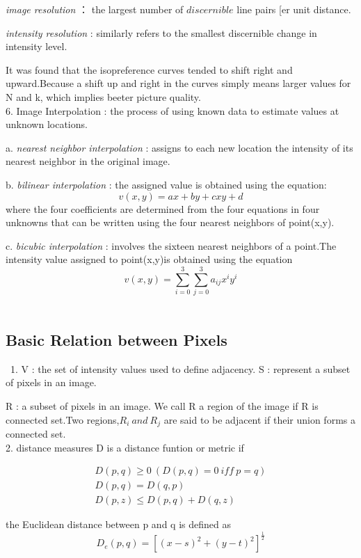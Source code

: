 \documentclass[12pt]{article}
\begin{document}
\quad \textsl{image resolution} ： the largest number of \begin{math}discernible\end{math} line pairs [er unit distance.

\quad \textsl{intensity resolution} : similarly refers to the smallest discernible change in intensity level.

It was found that the isopreference curves tended to shift right and upward.Because a shift up and right in the curves simply means larger values for N and k, which implies beeter picture quality.
\\
6. Image Interpolation : the process of using known data to estimate values at unknown locations.

a. \textsl{nearest neighbor interpolation} : assigns to each new location the intensity of its nearest neighbor in the original image.

b. \textsl{bilinear interpolation} : the assigned value is obtained using the equation:
\[
v(x,y)=ax+by+cxy+d
\]
where the four coefficients are determined from the four equations in four unknowns that can be written using the four nearest neighbors of point(x,y).

c. \textsl{bicubic interpolation} : involves the sixteen nearest neighbors of a point.The intensity value assigned to point(x,y)is obtained using the equation
\[ 
v(x,y)=\sum_{i=0}^3\sum_{j=0}^3a_{ij}x^iy^i
\]
\\
\subsection{Basic Relation between Pixels}\
1. V : the set of intensity values used to define adjacency.
\quad S : represent a subset of pixels in an image.

\quad R : a subset of pixels in an image. We call R a region of the image if R is connected set.Two regions,$R_i\ and\ R_j$ are said to be adjacent if their union forms a connected set.
\\
2. distance measures
  D is a distance funtion or metric if

\begin{eqnarray*}
D(p,q)\ge0\ (D(p,q)=0\ iff\ p=q)\\
D(p,q)=D(q,p)\ \ \ \ \ \ \ \ \ \ \ \\
D(p,z)\leq D(p,q)+D(q,z)\ \ \ \ 
\end{eqnarray*}

the Euclidean distance between p and q is defined as
\[
D_e(p,q)=[(x-s)^2+(y-t)^2]^{\frac12}
\]
\end{document}

